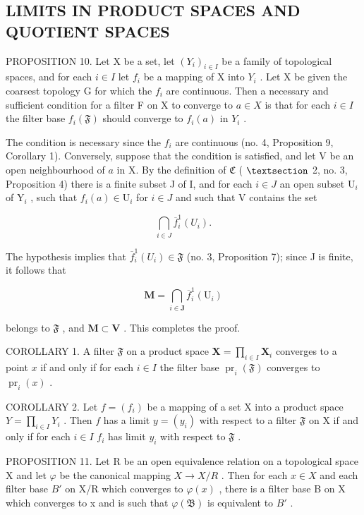 \subsection{LIMITS IN PRODUCT SPACES AND QUOTIENT SPACES}

PROPOSITION 10. Let X be a set, let \((Y_{i})_{i\in I}\) be a family of topological spaces, and for each \(i\in I\) let \(f_{i}\) be a mapping of X into \(Y_{i}\) . Let X be given the coarsest topology G for which the \(f_{i}\) are continuous. Then a necessary and sufficient condition for a filter F on X to converge to \(a\in X\) is that for each \(i\in I\) the filter base \(f_{i}(\mathfrak{F})\) should converge to \(f_{i}(a)\) in \(Y_{i}\) .

The condition is necessary since the \(f_{i}\) are continuous (no. 4, Proposition 9, Corollary 1). Conversely, suppose that the condition is satisfied, and let V be an open neighbourhood of \(a\) in X. By the definition of \(\mathfrak{C}\) ( \(\S\) 2, no. 3, Proposition 4) there is a finite subset J of I, and for each \(i\in J\) an open subset \(\mathrm{U}_{i}\) of \(\mathrm{Y}_{i}\) , such that \(f_{i}(a)\in\mathrm{U}_{i}\) for \(i\in J\) and such that V contains the set

\[
\bigcap_ {i \in J} \overline {{f}} _ {i} ^ {1} (U _ {i}).
\]

The hypothesis implies that \(\overline{f}_{i}^{1}(U_{i})\in\mathfrak{F}\) (no. 3, Proposition 7); since J is finite, it follows that

\[
\mathbf {M} = \bigcap_ {i \in \mathbf {J}} \overline {{f}} _ {i} ^ {1} (\mathrm{U} _ {i})
\]

belongs to \(\mathfrak{F}\) , and \(\mathbf{M} \subset \mathbf{V}\) . This completes the proof.

COROLLARY 1. A filter \(\mathfrak{F}\) on a product space \(\mathbf{X} = \prod_{i\in I}\mathbf{X}_i\) converges to a point \(x\) if and only if for each \(i\in I\) the filter base \(\operatorname{pr}_{i}(\mathfrak{F})\) converges to \(\operatorname{pr}_{i}(x)\) .

COROLLARY 2. Let \(f = (f_{i})\) be a mapping of a set X into a product space \(Y = \prod_{i \in I} Y_{i}\) . Then \(f\) has a limit \(y = (y_{i})\) with respect to a filter \(\mathfrak{F}\) on X if and only if for each \(i \in I\) \(f_{i}\) has limit \(y_{i}\) with respect to \(\mathfrak{F}\) .

PROPOSITION 11. Let R be an open equivalence relation on a topological space X and let \(\varphi\) be the canonical mapping \(X \rightarrow X/R\) . Then for each \(x \in X\) and each filter base \(B'\) on X/R which converges to \(\varphi(x)\) , there is a filter base B on X which converges to x and is such that \(\varphi(\mathfrak{B})\) is equivalent to \(B'\) .

